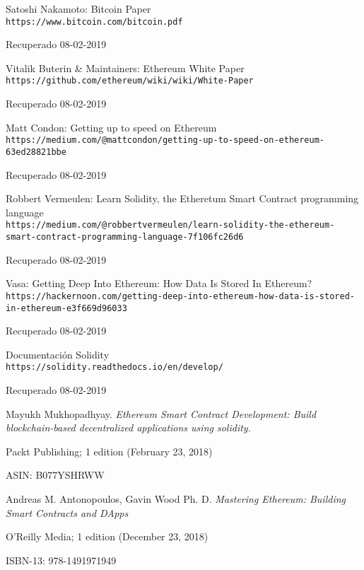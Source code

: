 \documentclass[a4paper,12pt,times,print,index]{Classes/PhDThesisPSnPDF}
\begin{document}
\begin{thebibliography}{40}
		Satoshi Nakamoto: Bitcoin Paper
		\\\texttt{https://www.bitcoin.com/bitcoin.pdf}
	
		Recuperado 08-02-2019
	
		Vitalik Buterin \& Maintainers: Ethereum White Paper
		\\\texttt{https://github.com/ethereum/wiki/wiki/White-Paper}
		
		Recuperado 08-02-2019
		
		Matt Condon: Getting up to speed on Ethereum
		\\\texttt{https://medium.com/@mattcondon/getting-up-to-speed-on-ethereum-63ed28821bbe}
		
		Recuperado 08-02-2019
		
		Robbert Vermeulen: Learn Solidity, the Etheretum Smart Contract programming language
		\\\texttt{https://medium.com/@robbertvermeulen/learn-solidity-the-ethereum-smart-contract-programming-language-7f106fc26d6}
		
		Recuperado 08-02-2019
		
		Vasa: Getting Deep Into Ethereum: How Data Is Stored In Ethereum?
		\\\texttt{https://hackernoon.com/getting-deep-into-ethereum-how-data-is-stored-in-ethereum-e3f669d96033}
		
		Recuperado 08-02-2019
	
		Documentación Solidity
		\\\texttt{https://solidity.readthedocs.io/en/develop/}
		
		Recuperado 08-02-2019
	
		Mayukh Mukhopadhyay. \textit{Ethereum Smart Contract Development: Build blockchain-based decentralized applications using solidity}.
		
		Packt Publishing; 1 edition (February 23, 2018)
		
		ASIN: B077YSHRWW  
	
		Andreas M. Antonopoulos, Gavin Wood Ph. D. \textit{Mastering Ethereum: Building Smart Contracts and DApps}

		O'Reilly Media; 1 edition (December 23, 2018)
		
		ISBN-13: 978-1491971949
		

\end{thebibliography}
\end{document}
